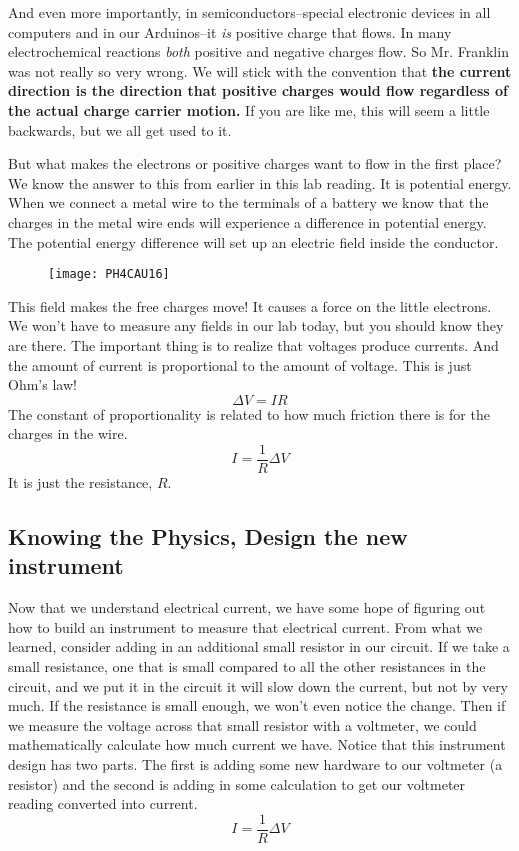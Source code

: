 And even more importantly, in semiconductors--special electronic devices in
all computers and in our Arduinos--it \emph{is} positive charge that flows.
In many electrochemical reactions \emph{both} positive and negative charges
flow. So Mr. Franklin was not really so very wrong. We will stick with the
convention that \textbf{the current direction is the direction that positive
charges would flow regardless of the actual charge carrier motion. }If you
are like me, this will seem a little backwards, but we all get used to it.

But what makes the electrons or positive charges want to flow in the first
place? We know the answer to this from earlier in this lab reading. It is
potential energy. When we connect a metal wire to the terminals of a battery
we know that the charges in the metal wire ends will experience a difference
in potential energy. The potential energy difference will set up an electric
field inside the conductor. \begin{figure}[h!]
\texttt{[image: PH4CAU16]}
\end{figure}

This field makes the free charges move! It causes a force on the little
electrons. We won't have to measure any fields in our lab today, but you
should know they are there. The important thing is to realize that voltages
produce currents. And the amount of current is proportional to the amount of
voltage. This is just Ohm's law! 
\begin{equation*}
\Delta V=IR
\end{equation*}%
The constant of proportionality is related to how much friction there is for
the charges in the wire.%
\begin{equation*}
I=\frac{1}{R}\Delta V
\end{equation*}%
It is just the resistance, $R$.\ 

\subsection{Knowing the Physics, Design the new instrument}

Now that we understand electrical current, we have some hope of figuring out
how to build an instrument to measure that electrical current. From what we
learned, consider adding in an additional small resistor in our circuit. If
we take a small resistance, one that is small compared to all the other
resistances in the circuit, and we put it in the circuit it will slow down
the current, but not by very much. If the resistance is small enough, we
won't even notice the change. Then if we measure the voltage across that
small resistor with a voltmeter, we could mathematically calculate how much
current we have. Notice that this instrument design has two parts. The first
is adding some new hardware to our voltmeter (a resistor) and the second is
adding in some calculation to get our voltmeter reading converted into
current. 
\begin{equation*}
I=\frac{1}{R}\Delta V
\end{equation*}

